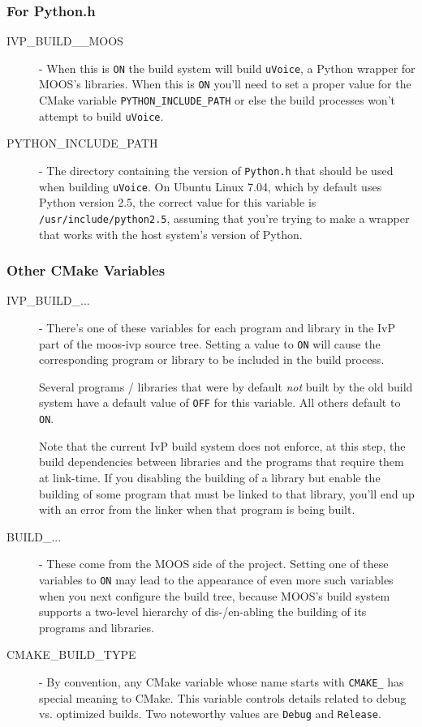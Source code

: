 \documentclass[letterpaper,10pt]{article}
\begin{document}
\subsubsection{For Python.h}
\begin{description}
 \item[IVP\_BUILD\_\_MOOS] - When this is \verb|ON| the build system will build \verb|uVoice|,
	a Python
	wrapper for MOOS's libraries.  When this is \verb|ON| you'll need to set a proper
	value for the CMake variable \verb|PYTHON_INCLUDE_PATH| or else the build processes
	won't attempt to build \verb|uVoice|.

 \item[PYTHON\_INCLUDE\_PATH] - The directory containing the version of \verb|Python.h| that
	should be used when building \verb|uVoice|.  On Ubuntu Linux 7.04, which by default
	uses Python version 2.5, the correct value for this variable is 
	\verb|/usr/include/python2.5|, assuming that you're trying to make a wrapper that
	works with the host system's version of Python.
 \end{description}

\subsubsection{Other CMake Variables}
\begin{description}
 \item[IVP\_BUILD\_...] - There's one of these variables for each program and library
	in the IvP part of the moos-ivp source tree.  Setting a value to \verb|ON| will
	cause the corresponding program or library to be included in the build process.

	Several programs / libraries that were by default \textit{not} built by the
	old build system have a default value of \verb|OFF| for this variable.  All others
	default to \verb|ON|.

	Note that the current IvP build system does not enforce, at this step, 
	the build dependencies between libraries and the programs that require them at
	link-time.  If you disabling the building of a library but enable the building
	of some program that must be linked to that library, you'll end up with an error
	from the linker when that program is being built.

 \item[BUILD\_...] - These come from the MOOS side of the project.  Setting one of these
	variables to \verb|ON| may lead to the appearance of even more such variables
	when you next configure the build tree, because MOOS's build system supports
	a two-level hierarchy of dis-/en-abling the building of its programs and libraries.

 \item[CMAKE\_BUILD\_TYPE] - By convention, any CMake variable whose name starts with
	\verb|CMAKE_| has special meaning to CMake.  This variable controls details related
	to debug vs. optimized builds.  Two noteworthy values are \verb|Debug| and \verb|Release|.

 \end{description}
\end{document}
